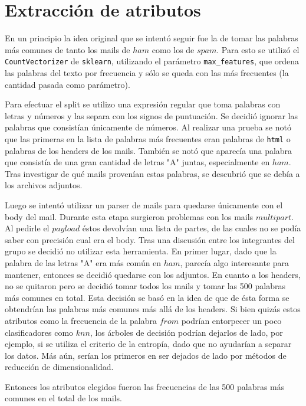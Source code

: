 \section{Extracción de atributos}

En un principio la idea original que se intentó seguir fue la de tomar las palabras más comunes de tanto los mails de $ham$ como los de $spam$. Para esto se utilizó el \texttt{CountVectorizer} de \texttt{sklearn}, utilizando el parámetro \texttt{max\_features}, que ordena las palabras del texto por frecuencia y sólo se queda con las más frecuentes (la cantidad pasada como parámetro). 

Para efectuar el split se utilizo una expresión regular que toma palabras con letras y números y las separa con los signos de puntuación. Se decidió ignorar las palabras que consistían únicamente de números. Al realizar una prueba se notó que las primeras en la lista de palabras más frecuentes eran palabras de \texttt{html} o palabras de los headers de los mails. También se notó que aparecía una palabra que consistía de una gran cantidad de letras "A" juntas, especialmente en $ham$. Tras investigar de qué mails provenían estas palabras, se descubrió que se debía a los archivos adjuntos.

Luego se intentó utilizar un parser de mails para quedarse únicamente con el body del mail. Durante esta etapa surgieron problemas con los mails $multipart$. Al pedirle el $payload$ éstos devolvían una lista de partes, de las cuales no se podía saber con precisión cual era el body. Tras una discusión entre los integrantes del grupo se decidió no utilizar esta herramienta. En primer lugar, dado que la palabra de las letras "A" era más común en $ham$, parecía algo interesante para mantener, entonces se decidió quedarse con los adjuntos. En cuanto a los headers, no se quitaron pero se decidió tomar todos los mails y tomar las 500 palabras más comunes en total. Esta decisión se basó en la idea de que de ésta forma se obtendrían las palabras más comunes más allá de los headers. Si bien quizás estos atributos como la frecuencia de la palabra $from$ podrían entorpecer un poco clasificadores como $knn$, los árboles de decisión podrían dejarlos de lado, por ejemplo, si se utiliza el criterio de la entropía, dado que no ayudarían a separar los datos. Más aún, serían los primeros en ser dejados de lado por métodos de reducción de dimensionalidad.

Entonces los atributos elegidos fueron las frecuencias de las 500 palabras más comunes en el total de los mails.